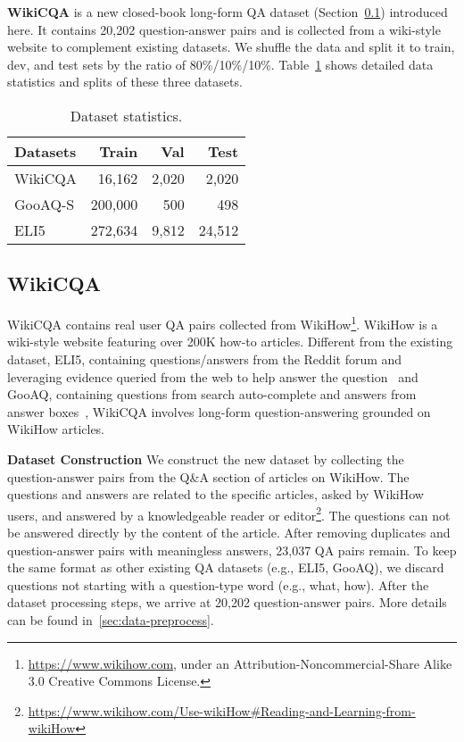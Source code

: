 \documentclass[11pt]{article}
\begin{document}
\smallskip
\noindent \textbf{WikiCQA} is a new closed-book long-form QA dataset (Section~\ref{sec:dataset}) introduced here. It contains 20,202 question-answer pairs and is collected from a wiki-style website to complement existing datasets. 
We shuffle the data and split it to train, dev, and test sets by the ratio of 80\%/10\%/10\%. Table~\ref{tab:data-split} shows detailed data statistics and splits of these three datasets.
\begin{table}[htbp!]
\centering \small
\begin{tabular}{lrrr}
\hline
\textbf{Datasets} & \textbf{Train} & \textbf{Val} & \textbf{Test}\\
\hline
WikiCQA & 16,162 & 2,020 & 2,020 \\
GooAQ-S & 200,000 & 500 & 498 \\
ELI5 & 272,634 & 9,812 & 24,512 \\
\hline
\end{tabular}
\caption{Dataset statistics.}
\label{tab:data-split}
\end{table}


\subsection{WikiCQA}
\label{sec:dataset}

WikiCQA contains real user QA pairs collected from WikiHow\footnote{\url{https://www.wikihow.com}, under an Attribution-Noncommercial-Share Alike 3.0 Creative Commons License.}. WikiHow is a wiki-style website featuring over 200K how-to articles.  Different from the existing dataset, ELI5, containing questions/answers from the Reddit forum and leveraging evidence queried from the web to help answer the question~\cite{fan-etal-2019-eli5} and GooAQ, containing questions from search auto-complete and answers from answer boxes~\cite{khashabi-etal-2021-gooaq-open}, WikiCQA involves long-form question-answering grounded on WikiHow articles. 



\smallskip
\noindent \textbf{Dataset Construction} 
We construct the new dataset by collecting the question-answer pairs from the Q\&A section of articles on WikiHow.  
The questions and answers are related to the specific articles, asked by WikiHow users, and answered by a knowledgeable reader or editor\footnote{\url{https://www.wikihow.com/Use-wikiHow\#Reading-and-Learning-from-wikiHow}}. 
The questions can not be answered directly by the content of the article.
After removing duplicates and question-answer pairs with meaningless answers, 23,037 QA pairs remain. 
To keep the same format as other existing QA datasets (e.g., ELI5, GooAQ), we discard questions not starting with a question-type word (e.g., what, how). 
After the dataset processing steps, we arrive at 20,202 question-answer pairs. More details can be found in~\ref{sec:data-preprocess}.
\end{document}

